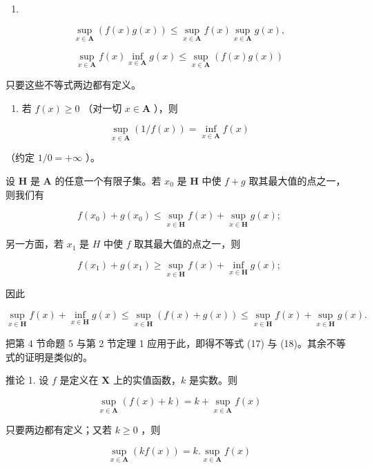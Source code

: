 \begin{enumerate}
\def\labelenumi{(\arabic{enumi})}
\setcounter{enumi}{18}
\tightlist
\item
\end{enumerate}

\[
\sup _ {x \in \mathbf {A}} (f (x) g (x)) \leqslant \sup _ {x \in \mathbf {A}} f (x) \sup _ {x \in \mathbf {A}} g (x),\tag{19}
\]

\[
\sup _ {x \in \mathbf {A}} f (x) \inf _ {x \in \mathbf {A}} g (x) \leqslant \sup _ {x \in \mathbf {A}} (f (x) g (x))\tag{20}
\]

只要这些不等式两边都有定义。

\begin{enumerate}
\def\labelenumi{(\roman{enumi})}
\setcounter{enumi}{2}
\tightlist
\item
  若 \(f(x) \geqslant 0\) （对一切 \(x \in \mathbf{A}\) ），则
\end{enumerate}

\[
\sup _ {x \in \mathbf {A}} (1 / f (x)) = \inf _ {x \in \mathbf {A}} f (x)\tag{21}
\]

（约定 \(1 / 0 = +\infty\) ）。

设 \(\mathbf{H}\) 是 \(\mathbf{A}\) 的任意一个有限子集。若 \(x_0\) 是 \(\mathbf{H}\) 中使 \(f + g\) 取其最大值的点之一，则我们有

\[
f (x _ {0}) + g (x _ {0}) \leqslant \sup _ {x \in \mathbf {H}} f (x) + \sup _ {x \in \mathbf {H}} g (x);
\]

另一方面，若 \(x_{1}\) 是 \(H\) 中使 \(f\) 取其最大值的点之一，则

\[
f (x _ {1}) + g (x _ {1}) \geqslant \sup _ {x \in \mathbf {H}} f (x) + \inf _ {x \in \mathbf {H}} g (x);
\]

因此

\[
\sup _ {x \in \mathbf {H}} f (x) + \inf _ {x \in \mathbf {H}} g (x) \leqslant \sup _ {x \in \mathbf {H}} (f (x) + g (x)) \leqslant \sup _ {x \in \mathbf {H}} f (x) + \sup _ {x \in \mathbf {H}} g (x).
\]

把第 4 节命题 5 与第 2 节定理 1 应用于此，即得不等式 (17) 与 (18)。其余不等式的证明是类似的。

推论 1. 设 \(f\) 是定义在 \(\mathbf{X}\) 上的实值函数，\(k\) 是实数。则

\[
\sup _ {x \in \mathbf {A}} (f (x) + k) = k + \sup _ {x \in \mathbf {A}} f (x)\tag{22}
\]

只要两边都有定义；又若 \(k \geqslant 0\) ，则

\[
\sup _ {x \in \mathbf {A}} (k f (x)) = k. \sup _ {x \in \mathbf {A}} f (x)\tag{23}
\]


